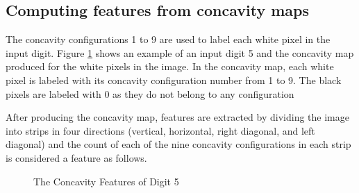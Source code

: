 \documentclass[conference]{IEEEtran}
\begin{document}
\subsection{Computing features from concavity maps}


The concavity configurations 1 to 9 are used to label each white pixel in the input digit. Figure  \ref{fig:VerticalDigit2} shows an example of an input digit 5 and the concavity map produced for the white pixels in the image. In the concavity map, each white pixel is labeled with its concavity configuration number from 1 to 9. The black pixels are labeled with 0 as they do not belong to any configuration

After producing the concavity map, features are extracted by dividing the image into strips in four directions (vertical, horizontal, right diagonal, and left diagonal) and the count of each of the nine concavity configurations in each strip is considered a feature as follows.
%
\begin{figure}
	\centering
	\caption[ Digit 5 ] {The Concavity Features of Digit 5 }
	\label{fig:VerticalDigit2}
\end{figure}
\end{document}
